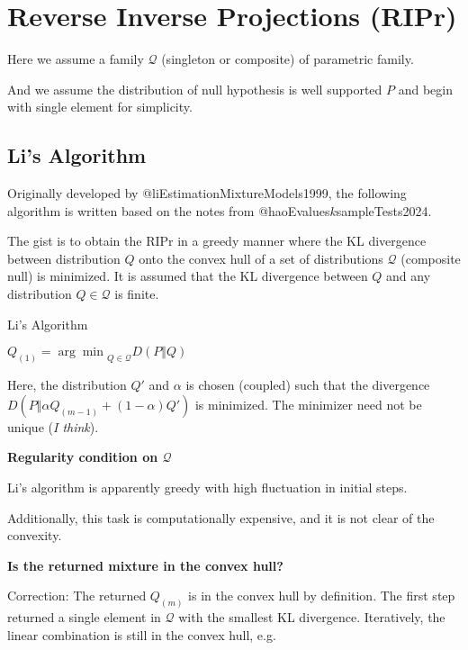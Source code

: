 \clearpage

\section{Reverse Inverse Projections (RIPr)}


Here we assume a family $\mathcal{Q}$ (singleton or composite) of parametric family.

And we assume the distribution of null hypothesis is well supported $P$ and
begin with single element for simplicity.


\subsection{Li's Algorithm}

Originally developed by @liEstimationMixtureModels1999,
the following algorithm is written based on the notes from \cite{grunwaldSafeTesting2024}
@haoEvalues$k$sampleTests2024.

The gist is to obtain the RIPr in a greedy manner where the KL divergence between
distribution $Q$ onto the convex hull of a set of distributions $\mathcal{Q}$
(composite null) is minimized. It is assumed that the KL divergence between $Q$
and any distribution $Q \in \mathcal{Q}$ is finite.

\begin{algorithm}
    \DontPrintSemicolon
    \caption{Li's Algorithm}
    \BlankLine
    $Q_{(1)} = {\arg\min}_{Q \in \mathcal{Q}} D(P \Vert Q)$\;
\end{algorithm}

Here, the distribution $Q'$ and $\alpha$ is chosen (coupled) such that
the divergence $D(P \Vert \alpha Q_{(m-1)} + (1 - \alpha) Q')$ is minimized. The
minimizer need not be unique (\textit{I think}).

\textbf{Regularity condition on $\mathcal{Q}$}

Li's algorithm is apparently greedy with high fluctuation in initial steps.

Additionally, this task is computationally expensive, and it is not clear of the convexity.

\textbf{Is the returned mixture in the convex hull?}

Correction:
The returned $Q_{(m)}$ is in the convex hull by definition. The first step
returned a single element in $\mathcal{Q}$ with the smallest KL divergence.
Iteratively, the linear combination is still in the convex hull, e.g.

